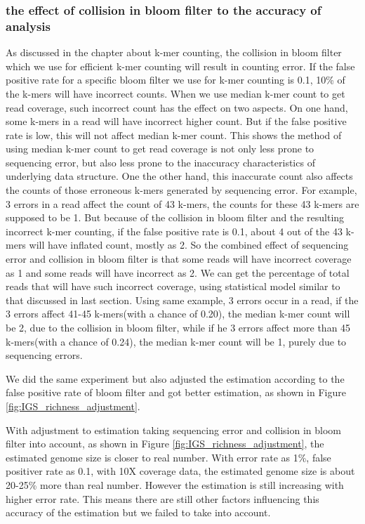 \subsubsection{the effect of collision in bloom filter to the accuracy of analysis}
As discussed in the chapter about k-mer counting, the collision in bloom filter
which we use for efficient k-mer counting will result in counting error. If the
false positive rate for a specific bloom filter we use for k-mer counting is
0.1, 10\% of the k-mers will have incorrect counts. When we use median k-mer
count to get read coverage, such incorrect count has the effect on two aspects.
On one hand, some k-mers in a read will have incorrect higher count. But if the
 false
positive rate is low, this will not affect median k-mer count. This shows the
method of using median k-mer count to get read coverage is not only less prone
to sequencing error, but also less prone to the inaccuracy characteristics of
underlying data structure. One the other hand, this inaccurate count also
affects the counts of those erroneous k-mers generated by sequencing error. For
example, 3 errors in a read affect the count of 43 k-mers, the counts for these
43 k-mers are supposed to be 1. But because of the collision in bloom filter
and the resulting incorrect k-mer counting, if the false positive rate is 0.1,
about 4 out of the 43 k-mers will have inflated count, mostly as 2. So the
combined effect of sequencing error and collision in bloom filter is that some
reads will have incorrect coverage as 1 and some reads will have incorrect as
2. We can get the percentage of total reads that will have such incorrect
coverage, using statistical model similar to that discussed in last section.
Using same example, 3 errors occur in a read, if the 3 errors affect 41-45
k-mers(with a chance of 0.20), the median k-mer count will be 2, due to the 
collision in bloom filter, while if he 3 errors affect more than 45 k-mers(with 
a chance of 0.24), the median k-mer count will be 1, purely due to sequencing 
errors. 

We did the same experiment but also adjusted the estimation according to the 
false positive rate of bloom filter and got better estimation, as shown in
Figure \ref{fig:IGS_richness_adjustment}.

With adjustment to estimation taking sequencing error and collision in bloom
filter into account, as shown in Figure \ref{fig:IGS_richness_adjustment}, the 
estimated genome size is closer to real number. With error rate as 1\%,
false positiver rate as 0.1, with 10X coverage data, the estimated genome size
is about 20-25\% more than real number. However the estimation is still 
increasing with higher
error rate. This means there are still other factors influencing this
accuracy of the estimation but we failed to take into account.


